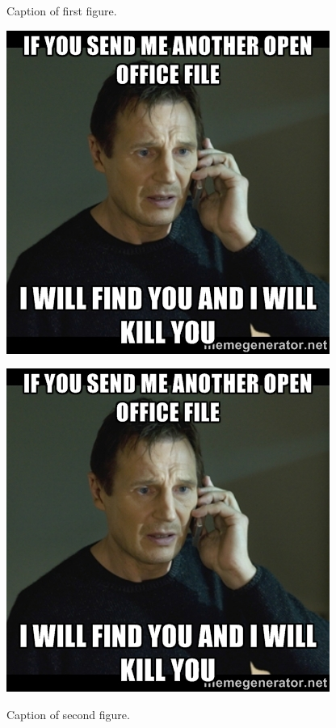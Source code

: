 \documentclass{report}
\begin{document}

\begin{figure}[t]
    \begin{floatrow}[2]
        \ffigbox
        {
         \caption{Caption of first figure.}
         \label{fig1}
        }
        {\includegraphics[width=1.\linewidth]{./img/57224825}}
        
        \ffigbox
        {
         \caption{Caption of second figure.}
         \label{fig2}
        }
        {\includegraphics[width=1.\linewidth]{./img/57224825}}
    \end{floatrow}
\end{figure}
\end{document}
